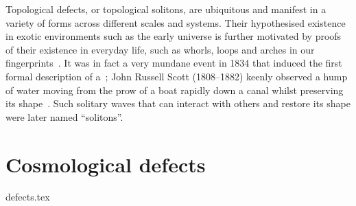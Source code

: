 %
%
%
Topological defects, or topological solitons, are ubiquitous and manifest in a variety of forms across different scales and systems. Their hypothesised existence in exotic environments such as the early universe is further motivated by proofs of their existence in everyday life, such as whorls, loops and arches in our fingerprints~\citep{fumeronIntroductionTopologicalDefects2023}. %
It was in fact a very mundane event in 1834 that induced the first formal description of a~; John Russell Scott (1808--1882) keenly observed a hump of water moving from the prow of a boat rapidly down a canal whilst preserving its shape~\citep{vachaspatiKinksDomainWalls2006}. Such solitary waves that can interact with others and restore its shape were later named ``solitons''.























\section{Cosmological defects}\label{sec:cosmo:defects}
{{defects.tex}}


